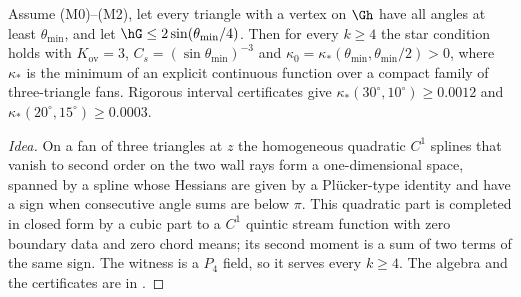 \begin{theorem}\label{thm:m3}
Assume (M0)--(M2), let every triangle with a vertex on $\Gh$ have all angles at least $\theta_{\min}$, and let $\hG\le2\sin(\theta_{\min}/4)$. Then for every $k\ge4$ the star condition holds with $K_{\mathrm{ov}}=3$, $C_s=(\sin\theta_{\min})^{-3}$ and $\kappa_0=\kappa_\ast(\theta_{\min},\theta_{\min}/2)>0$, where $\kappa_\ast$ is the minimum of an explicit continuous function over a compact family of three-triangle fans. Rigorous interval certificates give $\kappa_\ast(30^\circ,10^\circ)\ge0.0012$ and $\kappa_\ast(20^\circ,15^\circ)\ge0.0003$.
\end{theorem}

\begin{proof}[Idea]
On a fan of three triangles at $z$ the homogeneous quadratic $C^1$ splines that vanish to second order on the two wall rays form a one-dimensional space, spanned by a spline whose Hessians are given by a Pl\"ucker-type identity and have a sign when consecutive angle sums are below $\pi$. This quadratic part is completed in closed form by a cubic part to a $C^1$ quintic stream function with zero boundary data and zero chord means; its second moment is a sum of two terms of the same sign. The witness is a $P_4$ field, so it serves every $k\ge4$. The algebra and the certificates are in \cite{PadhiExt}.
\end{proof}

